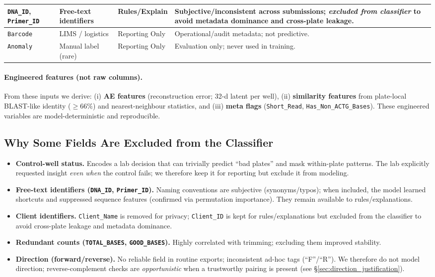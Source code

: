 \begin{table}[H]
\begin{tabular}{|p{4.0cm}|p{4.0cm}|p{3.1cm}|p{6.3cm}|}
\texttt{DNA\_ID}, \texttt{Primer\_ID}
& Free-text identifiers
& Rules/Explain
& Subjective/inconsistent across submissions; \emph{excluded from classifier} to avoid metadata dominance and cross-plate leakage. \\ \hline

\texttt{Barcode}
& LIMS / logistics
& Reporting Only
& Operational/audit metadata; not predictive. \\ \hline

\texttt{Anomaly}
& Manual label (rare)
& Reporting Only
& Evaluation only; never used in training. \\ \hline
\end{tabular}
\end{table}


\paragraph{Engineered features (not raw columns).}
From these inputs we derive: (i) \textbf{AE features} (reconstruction error; 32-d latent per well), (ii) \textbf{similarity features} from plate-local BLAST-like identity ($\geq 66\%$) and nearest-neighbour statistics, and (iii) \textbf{meta flags} (\texttt{Short\_Read}, \texttt{Has\_Non\_ACTG\_Bases}). These engineered variables are model-deterministic and reproducible.

\subsection{Why Some Fields Are Excluded from the Classifier}
\label{sec:exclusions_why}
\begin{itemize}
  \item \textbf{Control-well status.} Encodes a lab decision that can trivially predict ``bad plates'' and mask within-plate patterns. The lab explicitly requested insight \emph{even when} the control fails; we therefore keep it for reporting but exclude it from modeling.
  \item \textbf{Free-text identifiers (\texttt{DNA\_ID}, \texttt{Primer\_ID}).} Naming conventions are subjective (synonyms/typos); when included, the model learned shortcuts and suppressed sequence features (confirmed via permutation importance). They remain available to rules/explanations.
  \item \textbf{Client identifiers.} \texttt{Client\_Name} is removed for privacy; \texttt{Client\_ID} is kept for rules/explanations but excluded from the classifier to avoid cross-plate leakage and metadata dominance.
  \item \textbf{Redundant counts (\texttt{TOTAL\_BASES}, \texttt{GOOD\_BASES}).} Highly correlated with trimming; excluding them improved stability.
  \item \textbf{Direction (forward/reverse).} No reliable field in routine exports; inconsistent ad-hoc tags (``F''/``R''). We therefore do not model direction; reverse-complement checks are \emph{opportunistic} when a trustworthy pairing is present (see \S\ref{sec:direction_justification}).
\end{itemize}

